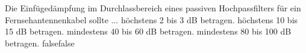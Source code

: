     {Die Einfügedämpfung im Durchlassbereich eines passiven Hochpassfilters für ein Fernsehantennenkabel sollte ...}
    {höchstens 2 bis 3 dB betragen.}
    {höchstens 10 bis 15 dB betragen.}
    {mindestens 40 bis 60 dB betragen.}
    {mindestens 80 bis 100 dB betragen.}
    {false}{false}